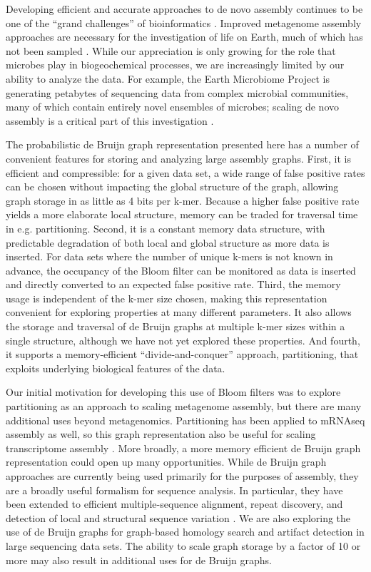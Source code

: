 \documentclass{pnastwo}
\begin{document}
\begin{article}

Developing efficient and accurate approaches to de novo assembly
continues to be one of the ``grand challenges'' of bioinformatics
\cite{pubmed22147368}.  Improved metagenome assembly approaches are
necessary for the investigation of life on Earth, much
of which has not been sampled \cite{terabasemetag}.  While our appreciation is
only growing for the role that microbes play in biogeochemical processes,
we are increasingly limited by our ability to analyze the data.  For
example, the Earth Microbiome Project is generating petabytes of
sequencing data from complex microbial communities, many of which
contain entirely novel ensembles of microbes; scaling de novo assembly
is a critical part of this investigation \cite{emp2010}.

The probabilistic de Bruijn graph representation presented here has a
number of convenient features for storing and analyzing large assembly
graphs.  First, it is efficient and compressible: for a given data
set, a wide range of false positive rates can be chosen without
impacting the global structure of the graph, allowing graph storage in
as little as 4 bits per k-mer.  Because a higher false positive rate
yields a more elaborate local structure, memory can be traded for
traversal time in e.g. partitioning.  Second, it is a constant memory
data structure, with predictable degradation of both local and global
structure as more data is inserted.  For data sets where the number of
unique k-mers is not known in advance, the occupancy of the Bloom
filter can be monitored as data is inserted and directly converted
to an expected false positive rate.  Third, the memory usage is
independent of the k-mer size chosen, making this representation
convenient for exploring properties at many different parameters.  It
also allows the storage and traversal of de Bruijn graphs at multiple
k-mer sizes within a single structure, although we have not yet
explored these properties.  And fourth, it supports a memory-efficient
``divide-and-conquer'' approach, partitioning, that exploits underlying biological features of
the data.

Our initial motivation for developing this use of Bloom filters was to
explore partitioning as an approach to scaling metagenome assembly,
but there are many additional uses beyond metagenomics.  Partitioning
has been applied to mRNAseq assembly as well, so this graph representation also be
useful for scaling transcriptome assembly \cite{trinity}.
More broadly, a more memory efficient de Bruijn graph representation could open up
many opportunities.  While de Bruijn graph approaches are currently
being used primarily for the purposes of assembly, they are a broadly
useful formalism for sequence analysis. In particular, they have been
extended to efficient multiple-sequence alignment\cite{zhang2003dna},
repeat discovery\cite{price2005novo}, and detection of local and
structural sequence variation \cite{zerbinothesis}.  We are also
exploring the use of de Bruijn graphs for graph-based homology search
and artifact detection in large sequencing data sets.  The ability to
scale graph storage by a factor of 10 or more may also result in
additional uses for de Bruijn graphs.


\end{article}
\end{document}
